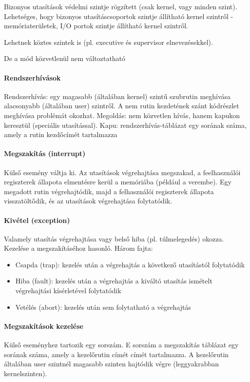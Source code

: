 \documentclass[fleqn,10pt,a4paper]{article}
\theoremstyle{magyar}
\begin{document}
  Bizonyos utasítások védelmi szintje rögzített (csak kernel, vagy minden szint). Lehetséges, hogy bizonyos
  utasításcsoportok szintje állítható kernel szintről - memóriaterületek, I/O portok szintje állítható kernel szintről.
  
  Lehetnek köztes szintek is (pl. executive és supervisor elnevezésekkel).
  
  De a mód közvetlenül nem változtatható

  \paragraph{Rendszerhívások}
  Rendszerhívás: egy magasabb (általában kernel) szintű szubrutin meghívása alacsonyabb (általában user) szintről. A nem
  rutin kezdetének szánt kódrészlet meghívása problémát okozhat. Megoldás: nem közvetlen hívás, hanem kapukon keresztül
  (speciális utasítással). Kapu: rendszerhívás-táblázat egy sorának száma, amely a rutin kezdőcímét tartalmazza


  \paragraph{Megszakítás (interrupt)}
  Külső esemény váltja ki. Az utasítások végrehajtása megszakad, a feelhasználói regiszterek állapota elmentésre kerül a
  memóriába (például a verembe). Egy megadott rutin végrehajtódik, majd a felhasználói regiszterek állapota
  visszatöltődik, és az utasítások végrehajtása folytatódik.
  
  \paragraph{Kivétel (exception)} Valamely utasítás végrehajtása vagy belső hiba (pl. túlmelegedés) okozza. Kezelése a megszakításéhoz hasonló.
  Három fajta: 
  \begin{itemize}
  \item Csapda (trap): kezelés után a végrehajtás a következő utasítástól folytatódik 
  \item Hiba (fault): kezelés után a végrehajtás a kiváltó utasítás ismételt végrehajtási kísérletével folytatódik 
  \item Vetélés (abort): kezelés után sem folytatható a végrehajtás
  \end{itemize}
  
  \paragraph{Megszakítások kezelése}
  Külső eseményhez tartozik egy sorszám. E sorszám a megszakítás táblázat egy sorának száma, amely a kezelőrutin címét
  címét tartalmazza. A kezelőrutin általában user szintnél magasabb szinten hajtódik végre (leggyakrabban kernelszinten).
  
\end{document}
